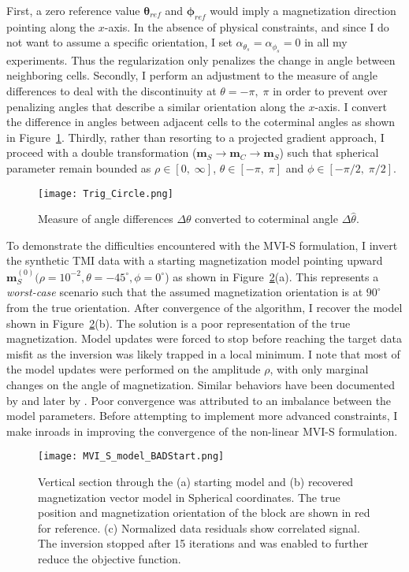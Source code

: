 First, a zero reference value $\boldsymbol \theta_{ref}$ and $\boldsymbol \phi_{ref}$ would imply a magnetization direction pointing along the $x$-axis. In the absence of physical constraints, and since I do not want to assume a specific orientation, I set $\alpha_{\theta_s}=\alpha_{\phi_s} = 0$ in all my experiments. Thus the regularization only penalizes the change in angle between neighboring cells. Secondly, I perform an adjustment to the measure of angle differences to deal with the discontinuity at $\theta = -\pi,\; \pi$ in order to prevent over penalizing angles that describe a similar orientation along the $x$-axis. I convert the difference in angles between adjacent cells to the coterminal angles as shown in Figure~\ref{Trig_Circle}. Thirdly, rather than resorting to a projected gradient approach, I proceed with a double transformation ($\mathbf{m}_S \rightarrow \mathbf{m}_C \rightarrow \mathbf{m}_S$) such that spherical parameter remain bounded as $\rho \in [0,\; \infty]$, $\theta \in [-\pi,\; \pi]$ and $\phi \in [-\pi/2,\; \pi/2]$.
\begin{figure}[h!]\centering
\texttt{[image: Trig\_Circle.png]}
\caption{Measure of angle differences $\Delta \theta$ converted to coterminal angle $\Delta\hat  \theta$.}
\label{Trig_Circle}
\end{figure}

To demonstrate the difficulties encountered with the MVI-S formulation, I invert the synthetic TMI data with a starting magnetization model pointing upward $\mathbf{m}_S^{(0)}(\rho=10^{-2}, \theta=-45^{\circ}, \phi=0^{\circ}$) as shown in Figure~\ref{MVI_S_model_noScale}(a). This represents a \emph{worst-case} scenario such that the assumed magnetization orientation is at $90^\circ$ from the true orientation.
After convergence of the algorithm, I recover the model shown in Figure~\ref{MVI_S_model_noScale}(b). The solution is a poor representation of the true magnetization. Model updates were forced to stop before reaching the target data misfit as the inversion was likely trapped in a local minimum. I note that most of the model updates were performed on the amplitude $\rho$, with only marginal changes on the angle of magnetization. Similar behaviors have been documented by \cite{Lelievre2009} and later by \cite{Liu2017}. Poor convergence was attributed to an imbalance between the model parameters. Before attempting to implement more advanced constraints, I make inroads in improving the convergence of the non-linear MVI-S formulation.
\begin{figure}[h!]
\texttt{[image: MVI\_S\_model\_BADStart.png]}
\caption{ Vertical section through the (a) starting model and (b) recovered magnetization vector model in Spherical coordinates. The true position and magnetization orientation of the block are shown in red for reference. (c) Normalized data residuals show correlated signal. The inversion stopped after 15 iterations and was enabled to further reduce the objective function.}
\label{MVI_S_model_noScale}
\end{figure}

